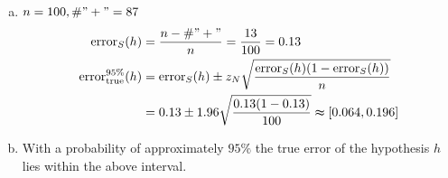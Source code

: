 \documentclass[10pt,a4paper,boxed]{hmcpset}
\begin{document}
		\begin{solution}		
			\begin{enumerate}[(a)]
				\item $n=100, \#"+"=87$
				\begin{align*}
					\textrm{error}_S(h) & = \frac{n-\#"+"}{n} = \frac{13}{100} = 0.13\\
					\textrm{error}_{\textrm{true}}^{95\%}(h) & = \textrm{error}_S(h) \pm z_N \sqrt{\frac{\textrm{error}_S(h)(1-\textrm{error}_S(h))}{n}}\\
															 & = 0.13 \pm 1.96 \sqrt{\frac{0.13(1-0.13)}{100}} \thickapprox [0.064,0.196]
				\end{align*}
					
				\item With a probability of approximately $95\%$ the true error of the hypothesis $h$ lies within the above interval.
			\end{enumerate}
			
		\end{solution}		

	
\end{document}
